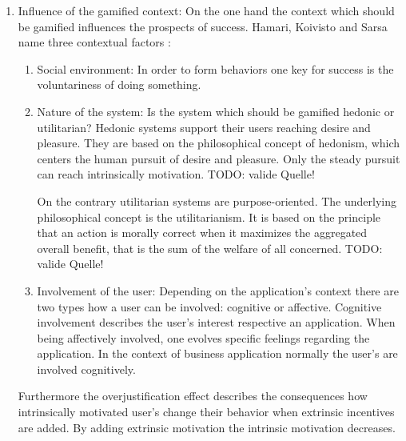 \begin{enumerate}
	\item Influence of the gamified context: \newline
	On the one hand the context which should be gamified influences the prospects of success.  Hamari, Koivisto and Sarsa name three contextual factors \cite[p. 3029, 3030]{hamariDoesGamificationWork2014}:
	\begin{enumerate}
		\item Social environment: \newline
		In order to form behaviors  one key for success is the voluntariness of doing something. \cite[p. 3030]{hamariDoesGamificationWork2014}
		
		\item Nature of the system: \newline
		Is the system which should be gamified hedonic or utilitarian? Hedonic systems support their users reaching desire and pleasure. \cite[p. 3030]{hamariDoesGamificationWork2014}
		They are based on the philosophical concept of hedonism, which centers the human pursuit of desire and pleasure. Only the steady pursuit can reach intrinsically motivation. TODO: valide Quelle!
		
		On the contrary utilitarian systems are purpose-oriented. The underlying philosophical concept is the utilitarianism. It is based on the principle that an action is morally correct when it maximizes the aggregated overall benefit, that is the sum of the welfare of all concerned. TODO: valide Quelle!
		
		\item Involvement of the user: \newline
		Depending on the application's context there are two types how a user can be involved: cognitive or affective. \cite[p. 3030]{hamariDoesGamificationWork2014} Cognitive involvement describes the user's interest respective an application. When being affectively involved, one evolves specific feelings regarding the application. In the context of business application normally the user's are involved cognitively. \cite{zaichkowskyPersonalInvolvementInventory2013}
	\end{enumerate}

	Furthermore the overjustification effect describes the consequences how intrinsically motivated user's change their behavior when extrinsic incentives are added. By adding extrinsic motivation the intrinsic motivation decreases. \cite[p. 9-13]{bierhoffeditorEnzyklopaediePsychologieSoziale2016}
	

\end{enumerate}
